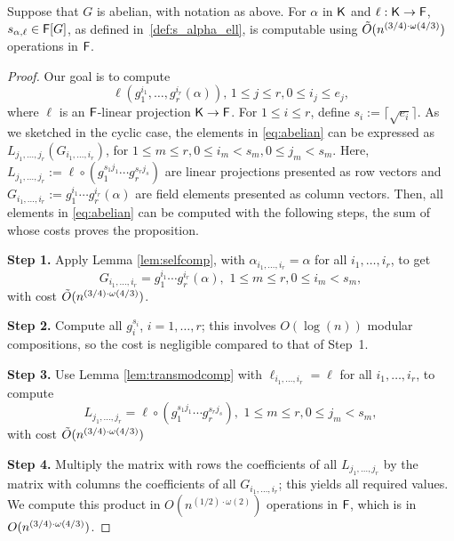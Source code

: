 \begin{proposition}\label{prop:abelian}
  Suppose that $G$ is abelian, with notation as above. For $\alpha$ in
  ${\mathsf{K}}$ and $\ell:{\mathsf{K}}\to{\mathsf{F}}$, $s_{\alpha,\ell} \in {\mathsf{F}}[G]$, as defined
  in~\eqref{def:s_alpha_ell}, is computable using $\tilde{O}(n^{(3/4)\cdot \omega(4/3)})$
  operations in ${\mathsf{F}}$.
\end{proposition}
\begin{proof}
Our goal is to compute
\begin{equation}\label{eq:abelian}
  \ell (g_1^{i_1},  \ldots, g_r^{i_r}(\alpha)), \, 1 \leq j \leq r, 0 \leq i_j \leq e_j,
\end{equation}
where $\ell$ is an ${\mathsf{F}}$-linear projection ${\mathsf{K}}\to {\mathsf{F}}$.  For $ 1\leq i
\leq r$, define $s_i:=\lceil\sqrt{e_i} \rceil$. As we sketched in the
cyclic case, the elements in \eqref{eq:abelian} can be expressed as
$L_{j_1,\dots, j_r} (G_{i_1,\dots,i_r})$, 
for $1\leq m \leq r, 0\leq i_m < s_m, 0 \leq j_m < s_m$.
Here, $L_{j_1,\dots,j_r} :=\ell \circ (g_1^{s_1j_1} \cdots
g_r^{s_rj_s})$ are linear projections presented as row vectors and
$G_{i_1,\dots,i_r}:=g_1^{i_1} \cdots g_r^{i_r}(\alpha)$ are field
elements presented as column vectors. Then, all elements in
\eqref{eq:abelian} can be computed with the following steps, the sum of whose 
costs proves the proposition.

\smallskip\noindent \textbf{Step 1.} Apply Lemma \ref{lem:selfcomp},
with $\alpha_{i_1,\dots,i_r} = \alpha$ for all $i_1,\dots,i_r$, to get
$$G_{i_1,\dots,i_r}=g_1^{i_1} \cdots g_r^{i_r}(\alpha), \,\, 1\leq m \leq r, 0\leq i_m < s_m,$$
with cost $\tilde{O}(n^{(3/4)\cdot \omega(4/3)})$.

\smallskip\noindent\textbf{Step 2.} Compute all $g_i^{s_i}$, $i=1,\dots,r$;
this involves $O(\log(n))$ modular compositions, so the cost is negligible
compared to that of Step~1.

\smallskip\noindent\textbf{Step 3.} Use Lemma \ref{lem:transmodcomp}
with $\ell_{i_1,\dots,i_r} = \ell$ for all $i_1,\dots,i_r$, to compute 
$$L_{j_1,\dots,j_r} = \ell \circ (g_1^{s_1j_1} \cdots
g_r^{s_rj_s}), \,\, 1\leq m \leq r, 0 \leq j_m < s_m,$$
with cost $\tilde{O}(n^{(3/4)\cdot \omega(4/3)})$

\smallskip\noindent\textbf{Step 4.} Multiply the matrix with rows the
coefficients of all $L_{j_1,\dots,j_r}$ by the matrix with columns the
coefficients of all $G_{i_1,\dots,i_r}$; this yields all required
values. We compute this product in $O(n^{(1/2)\cdot\omega(2)})$
operations in ${\mathsf{F}}$, which is in $O(n^{(3/4)\cdot \omega(4/3)})$.
\end{proof}

